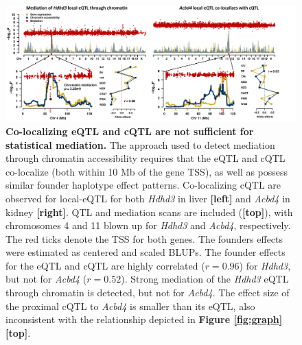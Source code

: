 \documentclass[9pt,twocolumn,twoside]{gsajnl}
\begin{document}
\begin{figure}[hp]
\renewcommand{\familydefault}{\sfdefault}\normalfont
\centering
\includegraphics[width=\textwidth]{figs/mediation_or_colocal.pdf}
\caption{\textbf{Co-localizing eQTL and cQTL are not sufficient for statistical mediation.} The approach used to detect mediation through chromatin accessibility requires that the eQTL and cQTL co-localize (both within 10 Mb of the gene TSS), as well as possess similar founder haplotype effect patterns. Co-localizing cQTL are observed for local-eQTL for both \textit{Hdhd3} in liver \textbf{[left]} and \textit{Acbd4} in kidney \textbf{[right]}. QTL and mediation scans are included (\textbf{[top]}), with chromosomes 4 and 11 blown up for \textit{Hdhd3} and \textit{Acbd4}, respectively. The red ticks denote the TSS for both genes. The founders effects were estimated as centered and scaled BLUPs. The founder effects for the eQTL and cQTL are highly correlated ($r = 0.96$) for \textit{Hdhd3}, but not for \textit{Acbd4} ($r = 0.52$). Strong mediation of the \textit{Hdhd3} eQTL through chromatin is detected, but not for \textit{Acbd4}. The effect size of the proximal cQTL to \textit{Acbd4} is smaller than its eQTL, also inconsistent with the relationship depicted in \textbf{Figure \ref{fig:graph}[top]}.\label{fig:colocalization}}
\end{figure}
\end{document}

